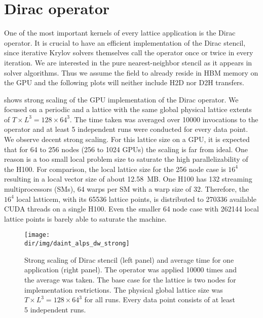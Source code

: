 \section{Dirac operator}
\label{sec:perf:dop}

One of the most important kernels of every lattice application is the Dirac operator.
It is crucial to have an efficient implementation of the Dirac stencil, since iterative Krylov solvers themselves call the operator once or twice in every iteration.
We are interested in the pure nearest-neighbor stencil as it appears in solver algorithms.
Thus we assume the field to already reside in HBM memory on the GPU and the following plots will neither include H2D nor D2H transfers.

 shows strong scaling of the GPU implementation of the Dirac operator.
We focused on a periodic and a \Cstar lattice with the same global physical lattice extents of $T \times L^{3} = 128 \times 64^{3}$.
The time taken was averaged over \num{10000} invocations to the operator and at least \num{5} independent runs were conducted for every data point.
We observe decent strong scaling.
For this lattice size on a GPU, it is expected that for \num{64} to \num{256} nodes (\num{256} to \num{1024} GPUs) the scaling is far from ideal.
One reason is a too small local problem size to saturate the high parallelizability of the H100.
For comparison, the local lattice size for the \num{256} node case is $16^{4}$ resulting in a local vector size of about \SI{12.58}{MB}.
One H100 has \num{132} streaming multiprocessors (SMs), \num{64} warps per SM with a warp size of \num{32}.
Therefore, the $16^{4}$ local latticem, with its \num{65536} lattice points, is distributed to \num{270336} available CUDA threads on a single H100.
Even the smaller \num{64} node case with \num{262144} local lattice points is barely able to saturate the machine.
\begin{figure}
    \centering
    \texttt{[image: \\dir/img/daint\_alps\_dw\_strong]}
    \caption{Strong scaling of Dirac stencil (left panel) and average time for one application (right panel). The operator was applied \num{10000} times and the average was taken. The base case for the \Cstar lattice is two nodes for implementation restrictions. The physical global lattice size was $T \times L^{3} = 128 \times 64^{3}$ for all runs. Every data point consists of at least \num{5} independent runs. }
    \label{fig:daint:alps:dw:strong}
\end{figure}

